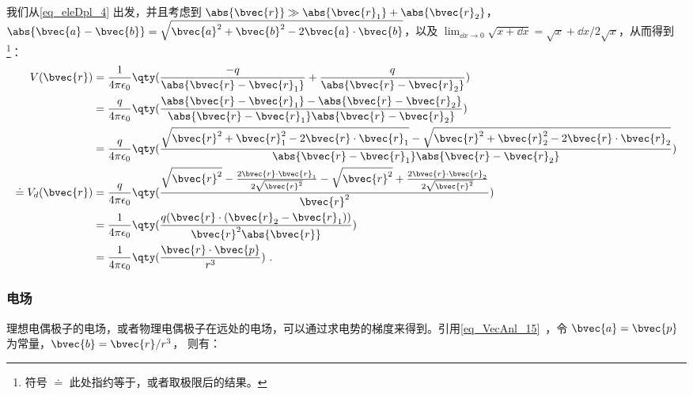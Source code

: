 我们从\autoref{eq_eleDpl_4} 出发，并且考虑到 $\abs{\bvec{r}}\gg\\\abs{\bvec{r}_1}+\abs{\bvec{r}_2}$，$\abs{\bvec{a}-\bvec{b}}=\sqrt{\bvec{a}^2+\bvec{b}^2-2\bvec{a}\cdot\bvec{b}}$，以及 $\lim_{\dd x\rightarrow 0}\sqrt{x+\dd x}=\sqrt{x}+\dd x/2\sqrt{x}$，从而得到\footnote{符号 $\doteq$ 此处指约等于，或者取极限后的结果。}：
\begin{equation}
\begin{aligned}
V(\bvec{r})&=\frac{1}{4\pi\epsilon_0}\qty(\frac{-q}{\abs{\bvec{r}-\bvec{r}_1}}+\frac{q}{\abs{\bvec{r}-\bvec{r}_2}})\\
&=\frac{q}{4\pi\epsilon_0}\qty(\frac{\abs{\bvec{r}-\bvec{r}_1}-\abs{\bvec{r}-\bvec{r}_2}}{\abs{\bvec{r}-\bvec{r}_1}\abs{\bvec{r}-\bvec{r}_2}})\\
&=\frac{q}{4\pi\epsilon_0}\qty(\frac{\sqrt{\bvec{r}^2+\bvec{r}_1^2-2\bvec{r}\cdot\bvec{r}_1}-\sqrt{\bvec{r}^2+\bvec{r}_2^2-2\bvec{r}\cdot\bvec{r}_2}}{\abs{\bvec{r}-\bvec{r}_1}\abs{\bvec{r}-\bvec{r}_2}})\\
\doteq V_d(\bvec{r})&=\frac{q}{4\pi\epsilon_0}\qty(\frac{\sqrt{\bvec{r}^2}-\frac{2\bvec{r}\cdot\bvec{r}_1}{2\sqrt{\bvec{r}^2}}-\sqrt{\bvec{r}^2}+\frac{2\bvec{r}\cdot\bvec{r}_2}{2\sqrt{\bvec{r}^2}}}{\bvec{r}^2})\\
&=\frac{1}{4\pi\epsilon_0}\qty(\frac{q(\bvec{r}\cdot(\bvec{r}_2-\bvec{r}_1))}{\bvec{r}^2\abs{\bvec{r}}})\\
&=\frac{1}{4\pi\epsilon_0}\qty(\frac{\bvec{r}\cdot\bvec{p}}{r^3})~.
\end{aligned}
\end{equation}



\subsubsection{电场}

理想电偶极子的电场，或者物理电偶极子在远处的电场，可以通过求电势的梯度来得到。引用\autoref{eq_VecAnl_15}~，令 $\bvec{a}=\bvec{p}$ 为常量，$\bvec{b}=\bvec{r}/r^3$， 则有：

